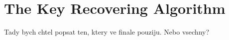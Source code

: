 \chapter{The Key Recovering Algorithm}

Tady bych chtel popsat ten, ktery ve finale pouziju. Nebo vsechny?